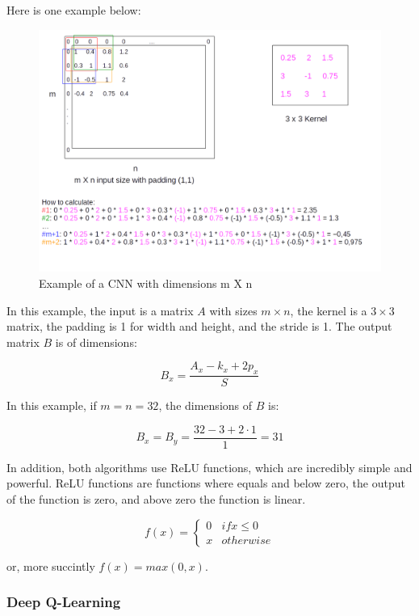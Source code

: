 \documentclass[11pt,twoside,a4paper]{article}
\begin{document}
Here is one example below:

\begin{figure}[h!]
  \includegraphics[width=\linewidth]{images/CNN-example.png}
  \caption{Example of a CNN with dimensions m X n}
  \label{fig:cnn-example}
\end{figure}

In this example, the input is a matrix $ A $ with sizes $ m \times n $, the
kernel is a $ 3 \times 3 $ matrix, the padding is 1 for width and height, and
the stride is 1. The output matrix $ B $ is of dimensions:

$$
B_{x} = \frac{A_{x} - k_{x} + 2p_{x}}{S}
$$

In this example, if $ m = n = 32 $, the dimensions of $ B $ is:

$$
B_{x} = B_{y} = \frac{32 - 3 + 2 \cdot 1}{1} = 31
$$

In addition, both algorithms use ReLU functions, which are incredibly simple and
powerful. ReLU functions are functions where equals and below zero, the output
of the function is zero, and above zero the function is linear.

$$
f(x) =
\begin{cases}
  0 & if x \leq 0 \\
  x & otherwise
\end{cases}
$$

or, more succintly $ f(x) = max(0, x) $.

\subsubsection*{Deep Q-Learning}
\end{document}
